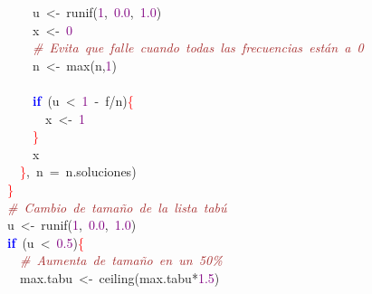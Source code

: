 \mbox{}\ \ \ \ \ \ \ \ \ \ u\ \textcolor{BrickRed}{\textless{}-}\ runif\textcolor{BrickRed}{(}\textcolor{Purple}{1}\textcolor{BrickRed}{,}\ \textcolor{Purple}{0.0}\textcolor{BrickRed}{,}\ \textcolor{Purple}{1.0}\textcolor{BrickRed}{)} \\
\mbox{}\ \ \ \ \ \ \ \ \ \ x\ \textcolor{BrickRed}{\textless{}-}\ \textcolor{Purple}{0} \\
\mbox{}\ \ \ \ \ \ \ \ \ \ \textit{\textcolor{Brown}{\#\ Evita\ que\ falle\ cuando\ todas\ las\ frecuencias\ están\ a\ 0}} \\
\mbox{}\ \ \ \ \ \ \ \ \ \ n\ \textcolor{BrickRed}{\textless{}-}\ max\textcolor{BrickRed}{(}n\textcolor{BrickRed}{,}\textcolor{Purple}{1}\textcolor{BrickRed}{)} \\
\mbox{}\ \ \ \ \ \ \ \ \ \  \\
\mbox{}\ \ \ \ \ \ \ \ \ \ \textbf{\textcolor{Blue}{if}}\ \textcolor{BrickRed}{(}u\ \textcolor{BrickRed}{\textless{}}\ \textcolor{Purple}{1}\ \textcolor{BrickRed}{-}\ f\textcolor{BrickRed}{/}n\textcolor{BrickRed}{)}\textcolor{Red}{\{} \\
\mbox{}\ \ \ \ \ \ \ \ \ \ \ \ x\ \textcolor{BrickRed}{\textless{}-}\ \textcolor{Purple}{1} \\
\mbox{}\ \ \ \ \ \ \ \ \ \ \textcolor{Red}{\}} \\
\mbox{}\ \ \ \ \ \ \ \ \ \ x \\
\mbox{}\ \ \ \ \ \ \ \ \textcolor{Red}{\}}\textcolor{BrickRed}{,}\ n\ \textcolor{BrickRed}{=}\ n\textcolor{BrickRed}{.}soluciones\textcolor{BrickRed}{)} \\
\mbox{}\ \ \ \ \ \ \textcolor{Red}{\}} \\
\mbox{}\ \ \ \ \ \ \textit{\textcolor{Brown}{\#\ Cambio\ de\ tamaño\ de\ la\ lista\ tabú}} \\
\mbox{}\ \ \ \ \ \ u\ \textcolor{BrickRed}{\textless{}-}\ runif\textcolor{BrickRed}{(}\textcolor{Purple}{1}\textcolor{BrickRed}{,}\ \textcolor{Purple}{0.0}\textcolor{BrickRed}{,}\ \textcolor{Purple}{1.0}\textcolor{BrickRed}{)} \\
\mbox{}\ \ \ \ \ \ \textbf{\textcolor{Blue}{if}}\ \textcolor{BrickRed}{(}u\ \textcolor{BrickRed}{\textless{}}\ \textcolor{Purple}{0.5}\textcolor{BrickRed}{)}\textcolor{Red}{\{} \\
\mbox{}\ \ \ \ \ \ \ \ \textit{\textcolor{Brown}{\#\ Aumenta\ de\ tamaño\ en\ un\ 50\%}} \\
\mbox{}\ \ \ \ \ \ \ \ max\textcolor{BrickRed}{.}tabu\ \textcolor{BrickRed}{\textless{}-}\ ceiling\textcolor{BrickRed}{(}max\textcolor{BrickRed}{.}tabu\textcolor{BrickRed}{*}\textcolor{Purple}{1.5}\textcolor{BrickRed}{)} \\
